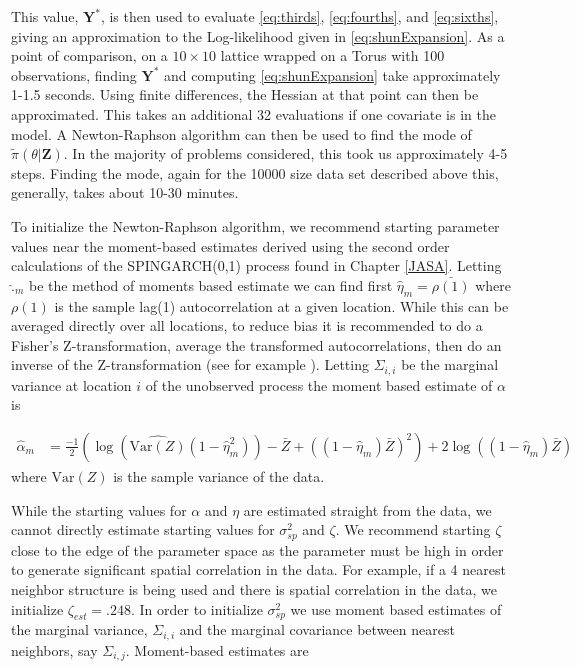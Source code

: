 \documentclass[11pt]{isuthesis}
\begin{document}
	This value, $\boldsymbol{Y}^*$, is then used to evaluate \eqref{eq:thirds}, \eqref{eq:fourths}, and \eqref{eq:sixths}, giving an approximation to the Log-likelihood given in \eqref{eq:shunExpansion}.  As a point of comparison, on a $10 \times 10$ lattice wrapped on a Torus with 100 observations, finding $\boldsymbol{Y}^*$ and computing \eqref{eq:shunExpansion} take approximately 1-1.5 seconds.  Using finite differences, the Hessian at that point can then be approximated.  This takes an additional 32 evaluations if one covariate is in the model.  A Newton-Raphson algorithm can then be used to find the mode of $\tilde{\pi}(\theta|\boldsymbol{Z})$.  In the majority of problems considered, this took us approximately 4-5 steps.  Finding the mode, again for the 10000 size data set described above this, generally, takes about 10-30 minutes.
	
	To initialize the Newton-Raphson algorithm, we recommend starting parameter values near the moment-based estimates derived using the second order calculations of the SPINGARCH(0,1) process found in Chapter \ref{JASA}.  Letting $\widehat{.}_m$ be the method of moments based estimate we can find first $\widehat{\eta}_m=\bar{\rho(1)}$ where $\rho(1)$ is the sample lag(1) autocorrelation at a given location.  While this can be averaged directly over all locations, to reduce bias it is recommended to do a Fisher's Z-transformation, average the transformed autocorrelations, then do an inverse of the Z-transformation (see for example \cite{silver1987averaging}).  Letting $\Sigma_{i,i}$ be the marginal variance at location $i$ of the unobserved process the moment based estimate of $\alpha$ is

	\begin{align}
		\widehat{\alpha}_m & = \frac{-1}{2}\left(\log\left(\widehat{\mbox{Var}(Z)}(1-\widehat{\eta}_m^2)\right)-\bar{Z}+((1-\widehat{\eta}_m)\bar{Z})^2\right)+2\log\left((1-\widehat{\eta}_m)\bar{Z}\right)
		 \label{eq:alphamom}
	\end{align}
	 where $\widehat{\mbox{Var}(Z)}$ is the sample variance of the data.
	 
	 While the starting values for $\alpha$ and $\eta$ are estimated straight from the data, we cannot directly estimate starting values for $\sigma_{sp}^2$ and $\zeta$.  We recommend starting $\zeta$ close to the edge of the parameter space as the parameter must be high in order to generate significant spatial correlation in the data.  For example, if a 4 nearest neighbor structure is being used and there is spatial correlation in the data, we initialize $\zeta_{est}=.248$.  In order to initialize $\sigma^2_{sp}$ we use moment based estimates of the marginal variance, $\Sigma_{i,i}$ and the marginal covariance between nearest neighbors, say $\Sigma_{i,j}$.  Moment-based estimates are
\end{document}

